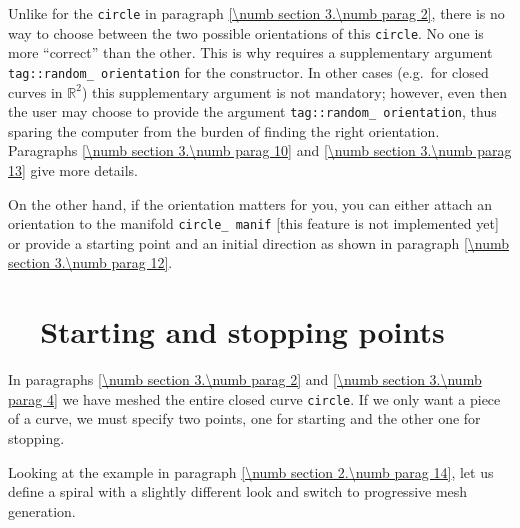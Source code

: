 Unlike for the {\small\tt circle} in paragraph \ref{\numb section 3.\numb parag 2},
there is no way to choose between the two possible orientations of this {\small\tt circle}.
No one is more ``correct'' than the other.
This is why {\maniFEM} requires a supplementary argument
{\small\tt \textcolor{tag}{tag}::random\_\,orientation}
for the {\small\tt {}} constructor.
In other cases (e.g.\ for closed curves in $ \mathbb{R}^2 $) this supplementary argument
is not mandatory; however, even then the user may choose to provide the argument
{\small\tt \textcolor{tag}{tag}::random\_\,orientation}, thus sparing the computer from the burden of
finding the right orientation.
Paragraphs \ref{\numb section 3.\numb parag 10} and \ref{\numb section 3.\numb parag 13}
give more details.

On the other hand, if the orientation matters for you, you can either attach an orientation
to the manifold {\small\tt circle\_\,manif} [this feature is not implemented yet]
or provide a starting point and an initial direction as shown in paragraph
\ref{\numb section 3.\numb parag 12}.


\section{~~Starting and stopping points}\label{\numb section 3.\numb parag 5}

In paragraphs \ref{\numb section 3.\numb parag 2} and \ref{\numb section 3.\numb parag 4}
we have meshed the entire closed curve {\small\tt circle}.
If we only want a piece of a curve, we must specify two points, one for starting and
the other one for stopping.

Looking at the example in paragraph \ref{\numb section 2.\numb parag 14}, let us define a
spiral with a slightly different look and switch to progressive mesh generation.

